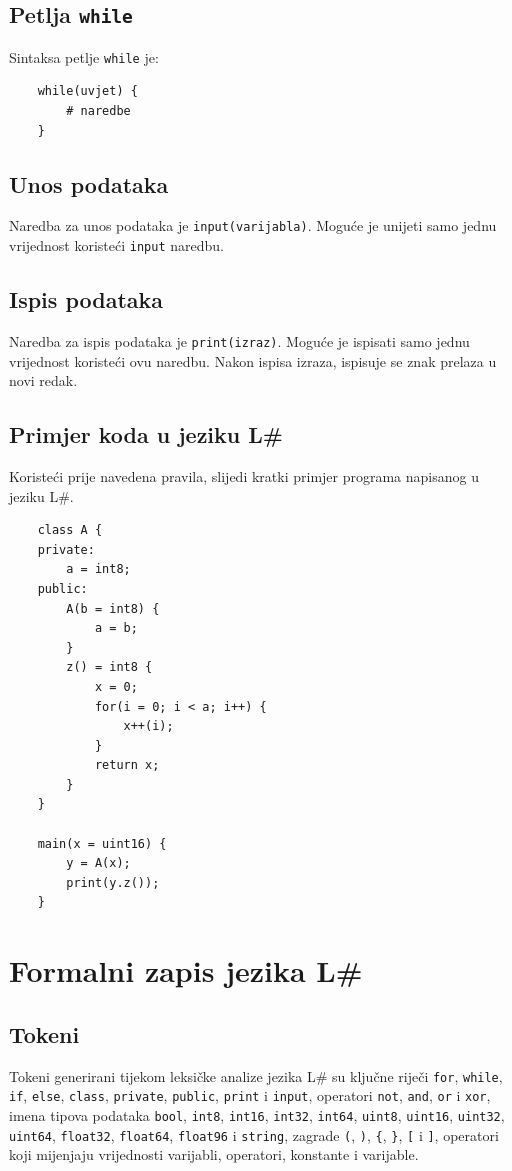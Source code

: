 \documentclass[times, utf8, zavrsni]{fer}
\begin{document}
\section{Petlja \texttt{while}}
Sintaksa petlje \verb|while| je:
\begin{verbatim}
    while(uvjet) {
        # naredbe
    }
\end{verbatim}

\section{Unos podataka}
Naredba za unos podataka je \verb|input(varijabla)|. Moguće je unijeti samo jednu vrijednost koristeći \verb|input|
naredbu.

\section{Ispis podataka}
Naredba za ispis podataka je \verb|print(izraz)|. Moguće je ispisati samo jednu vrijednost koristeći ovu naredbu.
Nakon ispisa izraza, ispisuje se znak prelaza u novi redak.

\section{Primjer koda u jeziku L\#}
Koristeći prije navedena pravila, slijedi kratki primjer programa napisanog u jeziku L\#.

\begin{verbatim}
    class A {
    private:
        a = int8;
    public:
        A(b = int8) {
            a = b;
        }
        z() = int8 {
            x = 0;
            for(i = 0; i < a; i++) {
                x++(i);
            }
            return x;
        }
    }

    main(x = uint16) {
        y = A(x);
        print(y.z());
    }
\end{verbatim}

\chapter{Formalni zapis jezika L\#}
\section{Tokeni}
Tokeni generirani tijekom leksičke analize jezika L\# su ključne riječi \verb|for|, \verb|while|, 
\verb|if|, \verb|else|, \verb|class|, \verb|private|, \verb|public|, \verb|print| i \verb|input|, operatori 
\verb|not|, \verb|and|, \verb|or| i \verb|xor|, imena tipova podataka \verb|bool|, \verb|int8|, \verb|int16|, \verb|int32|, \verb|int64|, \verb|uint8|,
\verb|uint16|, \verb|uint32|, \verb|uint64|, \verb|float32|, \verb|float64|, \verb|float96| i \verb|string|,
zagrade \verb|(|, \verb|)|, \verb|{|, \verb|}|, \verb|[| i \verb|]|, operatori koji mijenjaju vrijednosti varijabli,
operatori, konstante i varijable.
\end{document}
